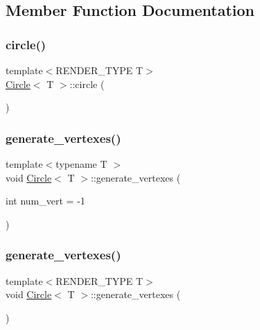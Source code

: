 \subsection{Member Function Documentation}
\mbox{\label{classCircle_aa019ad92cda5de45136856b99edd1894}} 
\subsubsection{\texorpdfstring{circle()}{circle()}}
{\footnotesize\ttfamily template$<$R\+E\+N\+D\+E\+R\+\_\+\+T\+Y\+PE T$>$ \\
\mbox{\hyperlink{classCircle}{Circle}}$<$ T $>$\+::circle (\begin{DoxyParamCaption}{ }\end{DoxyParamCaption})}

\mbox{\label{classCircle_a07ce44d6b3a70ee7cbcf19e02e50c361}} 
\subsubsection{\texorpdfstring{generate\+\_\+vertexes()}{generate\_vertexes()}\hspace{0.1cm}{\footnotesize\ttfamily [1/2]}}
{\footnotesize\ttfamily template$<$typename T $>$ \\
void \mbox{\hyperlink{classCircle}{Circle}}$<$ T $>$\+::generate\+\_\+vertexes (\begin{DoxyParamCaption}\item[{int}]{num\+\_\+vert = {\ttfamily -\/1} }\end{DoxyParamCaption})\hspace{0.3cm}{\ttfamily [private]}}

\mbox{\label{classCircle_ab8336c9a74a6f3378c5243363f55cfc6}} 
\subsubsection{\texorpdfstring{generate\+\_\+vertexes()}{generate\_vertexes()}\hspace{0.1cm}{\footnotesize\ttfamily [2/2]}}
{\footnotesize\ttfamily template$<$R\+E\+N\+D\+E\+R\+\_\+\+T\+Y\+PE T$>$ \\
void \mbox{\hyperlink{classCircle}{Circle}}$<$ T $>$\+::generate\+\_\+vertexes (\begin{DoxyParamCaption}{ }\end{DoxyParamCaption})}

